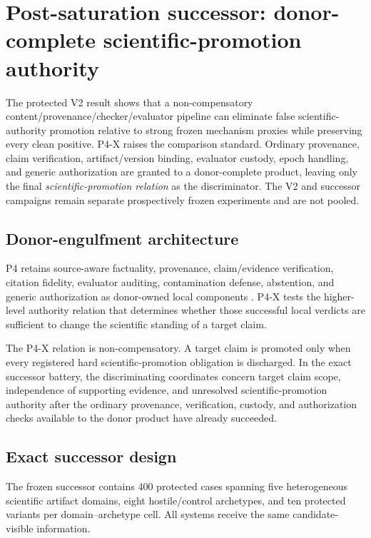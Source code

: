 \section{Post-saturation successor: donor-complete scientific-promotion authority}
\label{sec:p4x-successor}

The protected V2 result shows that a non-compensatory content/provenance/checker/evaluator pipeline can eliminate false scientific-authority promotion relative to strong frozen mechanism proxies while preserving every clean positive. P4-X raises the comparison standard. Ordinary provenance, claim verification, artifact/version binding, evaluator custody, epoch handling, and generic authorization are granted to a donor-complete product, leaving only the final \emph{scientific-promotion relation} as the discriminator. The V2 and successor campaigns remain separate prospectively frozen experiments and are not pooled.

\subsection{Donor-engulfment architecture}

P4 retains source-aware factuality, provenance, claim/evidence verification, citation fidelity, evaluator auditing, contamination defense, abstention, and generic authorization as donor-owned local components \citep{provenanceguard2026,provenai2026,provsen2026,benchguard2026,certifiedspeculative2026}. P4-X tests the higher-level authority relation that determines whether those successful local verdicts are sufficient to change the scientific standing of a target claim.

The P4-X relation is non-compensatory. A target claim is promoted only when every registered hard scientific-promotion obligation is discharged. In the exact successor battery, the discriminating coordinates concern target claim scope, independence of supporting evidence, and unresolved scientific-promotion authority after the ordinary provenance, verification, custody, and authorization checks available to the donor product have already succeeded.

\subsection{Exact successor design}

The frozen successor contains 400 protected cases spanning five heterogeneous scientific artifact domains, eight hostile/control archetypes, and ten protected variants per domain--archetype cell. All systems receive the same candidate-visible information.

